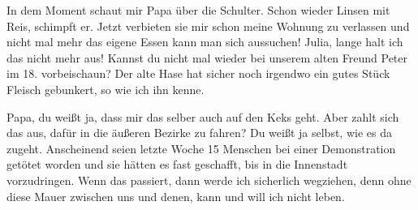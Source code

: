 \documentclass[twoside, a4paper, DIV=11, open=any, bibliography=totoc]{scrbook}
\newcommand{\Quote}[1]{\glqq #1\grqq{}}
\begin{document}
In dem Moment schaut mir Papa über die Schulter.
\Quote{Schon wieder Linsen mit Reis}, schimpft er. 
\Quote{Jetzt verbieten sie mir schon meine
Wohnung zu verlassen und nicht mal mehr das eigene Essen kann man sich aussuchen!
Julia, lange halt ich das nicht mehr aus! Kannst du nicht mal wieder bei unserem
alten Freund Peter im 18. vorbeischaun? Der alte Hase hat sicher noch irgendwo ein
gutes Stück Fleisch gebunkert, so wie ich ihn kenne.}

Papa, du weißt ja, dass mir das selber auch auf den Keks geht. Aber zahlt sich
das aus, dafür in die äußeren Bezirke zu fahren? Du weißt ja selbst, wie es
da zugeht. Anscheinend seien letzte Woche 15 Menschen bei einer
Demonstration getötet worden und sie hätten es fast geschafft, bis in die
Innenstadt vorzudringen. Wenn das passiert, 
dann werde ich sicherlich wegziehen, denn ohne diese Mauer zwischen uns
und denen, kann und will ich nicht leben. 
\end{document}
